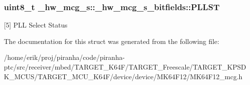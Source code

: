 \subsubsection[{\texorpdfstring{P\+L\+L\+ST}{PLLST}}]{\setlength{\rightskip}{0pt plus 5cm}uint8\+\_\+t \+\_\+hw\+\_\+mcg\+\_\+s\+::\+\_\+hw\+\_\+mcg\+\_\+s\+\_\+bitfields\+::\+P\+L\+L\+ST}\hypertarget{struct__hw__mcg__s_1_1__hw__mcg__s__bitfields_a9bf5add092474fd78fbeb59cf99e6d91}{}\label{struct__hw__mcg__s_1_1__hw__mcg__s__bitfields_a9bf5add092474fd78fbeb59cf99e6d91}
\mbox{[}5\mbox{]} P\+LL Select Status 

The documentation for this struct was generated from the following file\+:\begin{DoxyCompactItemize}
\item 
/home/erik/proj/piranha/code/piranha-\/ptc/src/receiver/mbed/\+T\+A\+R\+G\+E\+T\+\_\+\+K64\+F/\+T\+A\+R\+G\+E\+T\+\_\+\+Freescale/\+T\+A\+R\+G\+E\+T\+\_\+\+K\+P\+S\+D\+K\+\_\+\+M\+C\+U\+S/\+T\+A\+R\+G\+E\+T\+\_\+\+M\+C\+U\+\_\+\+K64\+F/device/device/\+M\+K64\+F12/M\+K64\+F12\+\_\+mcg.\+h\end{DoxyCompactItemize}
